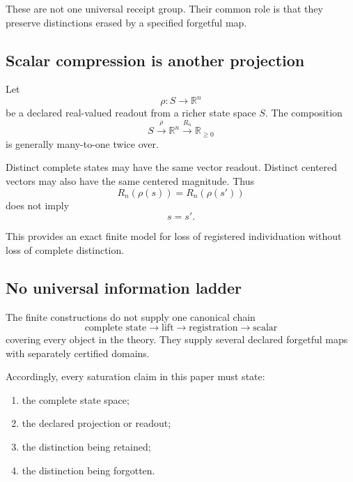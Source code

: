 These are not one universal receipt group.  Their common role is that
they preserve distinctions erased by a specified forgetful map.

\subsection{Scalar compression is another projection}

Let
\[
\rho:S\longrightarrow\mathbb R^n
\]
be a declared real-valued readout from a richer state space \(S\).
The composition
\[
S
\overset{\rho}{\longrightarrow}
\mathbb R^n
\overset{R_n}{\longrightarrow}
\mathbb R_{\ge0}
\]
is generally many-to-one twice over.

Distinct complete states may have the same vector readout.  Distinct
centered vectors may also have the same centered magnitude.  Thus
\[
R_n(\rho(s))=R_n(\rho(s'))
\]
does not imply
\[
s=s'.
\]

This provides an exact finite model for loss of registered
individuation without loss of complete distinction.

\subsection{No universal information ladder}

The finite constructions do not supply one canonical chain
\[
\text{complete state}
\longrightarrow
\text{lift}
\longrightarrow
\text{registration}
\longrightarrow
\text{scalar}
\]
covering every object in the theory.  They supply several declared
forgetful maps with separately certified domains.

Accordingly, every saturation claim in this paper must state:

\begin{enumerate}[label=(\roman*)]
\item the complete state space;
\item the declared projection or readout;
\item the distinction being retained;
\item the distinction being forgotten.
\end{enumerate}
